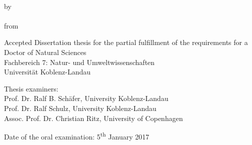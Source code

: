
\begin{titlepage}
    \begin{center}
        \begingroup
            \vspace{5cm}
            \textbf{\LARGE\spacedallcaps{\myTitleOnTitlePageLineOne}}\\[0.5em]
            \spacedallcaps{\myTitleOnTitlePageLineTwo}
        \endgroup
        
        \vfill

        \begingroup
            by\\[1em]
            \Large \spacedlowsmallcaps{\myName} \\
            \small from \spacedlowsmallcaps{\myLocation}
        \endgroup

        \vfill

        \begingroup
            \small
            Accepted Dissertation thesis for the partial fulfillment of the requirements for a \\
            Doctor of Natural Sciences \\
            Fachbereich 7: Natur- und Umweltwissenschaften \\
            Universität Koblenz-Landau
        \endgroup

        \vfill

        \begingroup
            \small
            Thesis examiners: \\
            Prof. Dr. Ralf B. Schäfer, University Koblenz-Landau \\
            Prof. Dr. Ralf Schulz, University Koblenz-Landau\\
            Assoc. Prof. Dr. Christian Ritz, University of Copenhagen
        \endgroup

        \vfill

        \begingroup
            \small
            Date of the oral examination: 5\textsuperscript{th} January 2017
        \endgroup
                           

    \end{center}       
\end{titlepage}   
 
